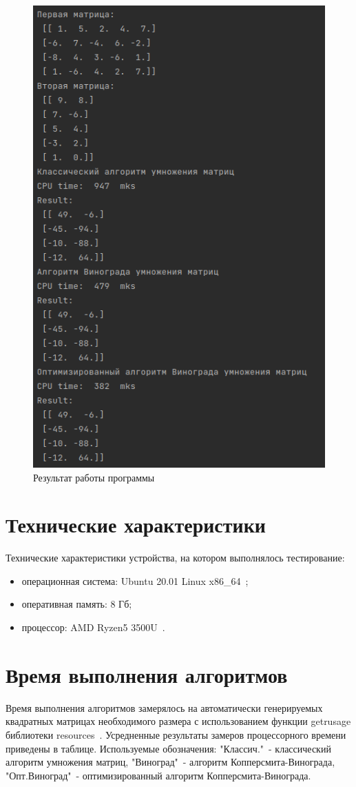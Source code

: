 \documentclass[a4paper,oneside,14pt]{extreport}
\begin{document}
\begin{figure}[H]
	\centering
	\includegraphics[width=0.7\linewidth]{images/example2}
	\caption{Результат работы программы}
	\label{fig:work_example2}
\end{figure}

\section{Технические характеристики}
Технические характеристики устройства, на котором выполнялось тестирование:
\begin{itemize}
	\item операционная система: Ubuntu 20.01 Linux x86\_64~\cite{ubuntu};
	\item оперативная память: 8 Гб;
	\item процессор: AMD Ryzen5 3500U~\cite{processor}.
\end{itemize}

\section{Время выполнения алгоритмов}

Время выполнения алгоритмов замерялось на автоматически генерируемых квадратных матрицах необходимого размера с использованием функции getrusage библиотеки resources~\cite{resource}. Усредненные результаты замеров процессорного времени приведены в таблице. Используемые обозначения: "Классич."\ - классический алгоритм умножения матриц, "Виноград"\ - алгоритм Копперсмита-Винограда, "Опт.Виноград"\ - оптимизированный алгоритм Копперсмита-Винограда.  
\end{document}
